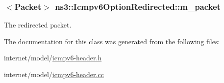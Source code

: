\subsubsection[{\texorpdfstring{m\+\_\+packet}{m_packet}}]{$<${\bf Packet}$>$ ns3\+::\+Icmpv6\+Option\+Redirected\+::m\+\_\+packet\hspace{0.3cm}{\ttfamily [private]}}\hypertarget{classns3_1_1Icmpv6OptionRedirected_a3b16f20784c55f8d9ef3a22817eed135}{}\label{classns3_1_1Icmpv6OptionRedirected_a3b16f20784c55f8d9ef3a22817eed135}


The redirected packet. 



The documentation for this class was generated from the following files\+:\begin{DoxyCompactItemize}
\item 
internet/model/\hyperlink{icmpv6-header_8h}{icmpv6-\/header.\+h}\item 
internet/model/\hyperlink{icmpv6-header_8cc}{icmpv6-\/header.\+cc}\end{DoxyCompactItemize}
